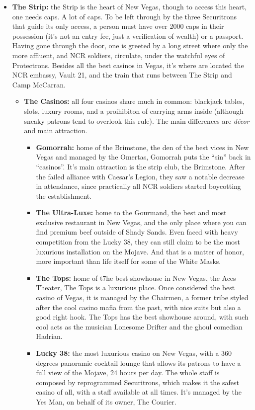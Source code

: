 \begin{itemize}
\item \textbf{The Strip:} the Strip is the heart of New Vegas, though to access this heart, one needs caps. A lot of caps. To be left through by the three Securitrons that guide its only access, a person must have over 2000 caps in their possession (it's not an entry fee, just a verification of wealth) or a passport. Having gone through the door, one is greeted by a long street where only the more affluent, and NCR soldiers, circulate, under the watchful eyes of Protectrons. Besides all the best casinos in Vegas, it's where are located the NCR embassy, Vault 21, and the train that runs between The Strip and Camp McCarran. 
	\begin{itemize}
	\item \textbf{The Casinos:} all four casinos share much in common: blackjack tables, slots, luxury rooms, and a proihibiton of carrying arms inside (although sneaky patrons tend to overlook this rule). The main differences are \textit{décor} and main attraction. 
		\begin{itemize}
		\item \textbf{Gomorrah:} home of the Brimstone, the den of the best vices in New Vegas and managed by the Omertas, Gomorrah puts the ``sin'' back in ``casinos''. It's main attraction is the strip club, the Brimstone. After the failed alliance with Caesar's Legion, they saw a notable decrease in attendance, since practically all NCR soldiers started boycotting the establishment.
		\item \textbf{The Ultra-Luxe:} home to the Gourmand, the best and most exclusive restaurant in New Vegas, and the only place where you can find premium beef outside of Shady Sands. Even faced with heavy competition from the Lucky 38, they can still claim to be the most luxurious installation on the Mojave. And that is a matter of honor, more important than life itself for some of the White Masks.
		\item \textbf{The Tops:} home of t7he best showhouse in New Vegas, the Aces Theater, The Tops is a luxurious place. Once considered the best casino of Vegas, it is managed by the Chairmen, a former tribe styled after the cool casino mafia from the past, with nice suits but also a good right hook. The Tops has the best showhouse around, with such cool acts as the musician Lonesome Drifter and the ghoul comedian Hadrian.
		\item \textbf{Lucky 38:} the most luxurious casino on New Vegas, with a 360 degrees panoramic cocktail lounge that allows its patrons to have a full view of the Mojave, 24 hours per day. The whole staff is composed by reprogrammed Securitrons, which makes it the safest casino of all, with a staff available at all times. It's managed by the Yes Man, on behalf of its owner, The Courier.
		\end{itemize}
	\end{itemize}


\end{itemize}
